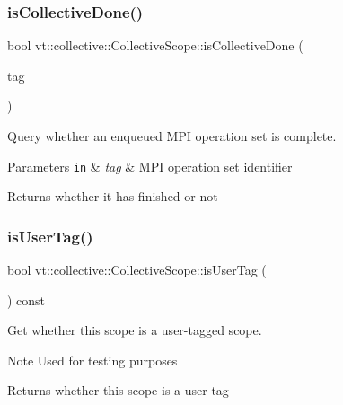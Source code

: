 \subsubsection{\texorpdfstring{is\+Collective\+Done()}{isCollectiveDone()}}
{\footnotesize\ttfamily bool vt\+::collective\+::\+Collective\+Scope\+::is\+Collective\+Done (\begin{DoxyParamCaption}\item[{\hyperlink{namespacevt_a84ab281dae04a52a4b243d6bf62d0e52}{Tag\+Type}}]{tag }\end{DoxyParamCaption})}



Query whether an enqueued M\+PI operation set is complete. 


\begin{DoxyParams}[1]{Parameters}
\mbox{\tt in}  & {\em tag} & M\+PI operation set identifier\\
\hline
\end{DoxyParams}
\begin{DoxyReturn}{Returns}
whether it has finished or not 
\end{DoxyReturn}
\mbox{\label{structvt_1_1collective_1_1_collective_scope_a8f8aa109ef27449f8fcb5eb378587196}} 
\subsubsection{\texorpdfstring{is\+User\+Tag()}{isUserTag()}}
{\footnotesize\ttfamily bool vt\+::collective\+::\+Collective\+Scope\+::is\+User\+Tag (\begin{DoxyParamCaption}{ }\end{DoxyParamCaption}) const\hspace{0.3cm}{\ttfamily [inline]}}



Get whether this scope is a user-\/tagged scope. 

\begin{DoxyNote}{Note}
Used for testing purposes
\end{DoxyNote}
\begin{DoxyReturn}{Returns}
whether this scope is a user tag 
\end{DoxyReturn}
\mbox{\label{structvt_1_1collective_1_1_collective_scope_ad116d0b00f28b79dbf7c4b0e5c4ed4a1}} 
